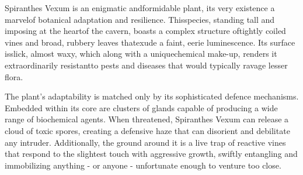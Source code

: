 \hspace*{3cm}Spiranthes Vexum is an enigmatic and\linebreak\hspace*{2.25cm}formidable plant, its very existence a marvel\linebreak\hspace*{2cm}of botanical adaptation and resilience. This\linebreak\hspace*{1.6cm}species, standing tall and imposing at the heart\linebreak\hspace*{1.6cm}of the cavern, boasts a complex structure of\linebreak\hspace*{1.6cm}tightly coiled vines and broad, rubbery leaves that\linebreak\hspace*{1.8cm}exude a faint, eerie luminescence. Its surface is\linebreak\hspace*{1.3cm}slick, almost waxy, which along with a unique\linebreak\hspace*{0.8cm}chemical make-up, renders it extraordinarily resistant\linebreak\hspace*{0.4cm}to pests and diseases that would typically ravage lesser flora.

The plant's adaptability is matched only by its sophisticated defence mechanisms. Embedded within its core are clusters of glands capable of producing a wide range of biochemical agents. When threatened, Spiranthes Vexum can release a cloud of toxic spores, creating a defensive haze that can disorient and debilitate any intruder. Additionally, the ground around it is a live trap of reactive vines that respond to the slightest touch with aggressive growth, swiftly entangling and immobilizing anything - or anyone - unfortunate enough to venture too close.


